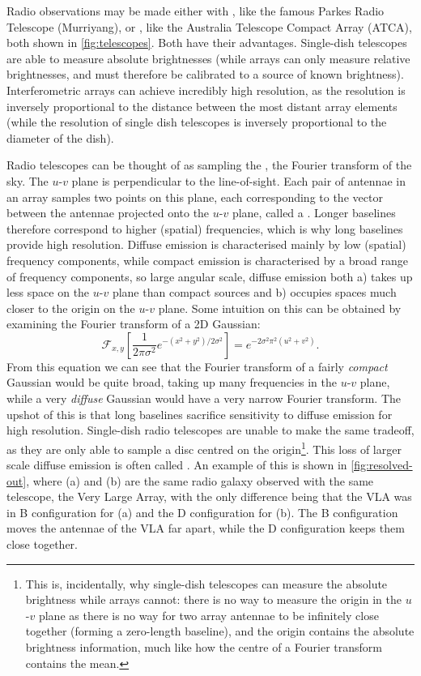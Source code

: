         Radio observations may be made either with , like the famous Parkes Radio Telescope (Murriyang), or , like the Australia Telescope Compact Array (ATCA), both shown in \autoref{fig:telescopes}. Both have their advantages. Single-dish telescopes are able to measure absolute brightnesses (while arrays can only measure relative brightnesses, and must therefore be calibrated to a source of known brightness). Interferometric arrays can achieve incredibly high resolution, as the resolution is inversely proportional to the distance between the most distant array elements (while the resolution of single dish telescopes is inversely proportional to the diameter of the dish).

        Radio telescopes can be thought of as sampling the , the Fourier transform of the sky. The $u$-$v$ plane is perpendicular to the line-of-sight. Each pair of antennae in an array samples two points on this plane, each corresponding to the vector between the antennae projected onto the $u$-$v$ plane, called a . Longer baselines therefore correspond to higher (spatial) frequencies, which is why long baselines provide high resolution. Diffuse emission is characterised mainly by low (spatial) frequency components, while compact emission is characterised by a broad range of frequency components, so large angular scale, diffuse emission both a) takes up less space on the $u$-$v$ plane than compact sources and b) occupies spaces much closer to the origin on the $u$-$v$ plane. Some intuition on this can be obtained by examining the Fourier transform of a 2D Gaussian:
        \begin{equation}
            \mathcal F_{x, y}\left[\frac{1}{2\pi\sigma^2} e^{-(x^2 + y^2) / 2\sigma^2}\right] = e^{-2\sigma^2 \pi^2(u^2 + v^2)}.
        \end{equation}
        From this equation we can see that the Fourier transform of a fairly \emph{compact} Gaussian would be quite broad, taking up many frequencies in the $u$-$v$ plane, while a very \emph{diffuse} Gaussian would have a very narrow Fourier transform. The upshot of this is that long baselines sacrifice sensitivity to diffuse emission for high resolution. Single-dish radio telescopes are unable to make the same tradeoff, as they are only able to sample a disc centred on the origin\footnote{This is, incidentally, why single-dish telescopes can measure the absolute brightness while arrays cannot: there is no way to measure the origin in the $u$-$v$ plane as there is no way for two array antennae to be infinitely close together (forming a zero-length baseline), and the origin contains the absolute brightness information, much like how the centre of a Fourier transform contains the mean.}. This loss of larger scale diffuse emission is often called . An example of this is shown in \autoref{fig:resolved-out}, where (a) and (b) are the same radio galaxy observed with the same telescope, the Very Large Array, with the only difference being that the VLA was in B configuration for (a) and the D configuration for (b). The B configuration moves the antennae of the VLA far apart, while the D configuration keeps them close together.

